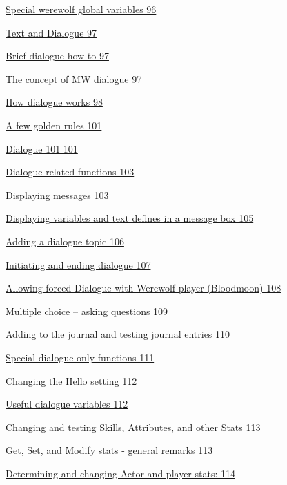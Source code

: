 \documentclass[
]{article}
\begin{document}
\protect\hyperlink{section-8}{Special werewolf global variables 96}

\protect\hyperlink{text-and-dialogue}{Text and Dialogue 97}

\protect\hyperlink{brief-dialogue-how-to}{Brief dialogue how-to 97}

\protect\hyperlink{the-concept-of-mw-dialogue}{The concept of MW
dialogue 97}

\protect\hyperlink{how-dialogue-works}{How dialogue works 98}

\protect\hyperlink{a-few-golden-rules}{A few golden rules 101}

\protect\hyperlink{dialogue-101}{Dialogue 101 101}

\protect\hyperlink{dialogue-related-functions}{Dialogue-related
functions 103}

\protect\hyperlink{displaying-messages}{Displaying messages 103}

\protect\hyperlink{_Toc182634588}{Displaying variables and text defines
in a message box 105}

\protect\hyperlink{adding-a-dialogue-topic}{Adding a dialogue topic 106}

\protect\hyperlink{initiating-and-ending-dialogue}{Initiating and ending
dialogue 107}

\protect\hyperlink{allowing-forced-dialogue-with-werewolf-player-bloodmoon}{Allowing
forced Dialogue with Werewolf player (Bloodmoon) 108}

\protect\hyperlink{multiple-choice-asking-questions}{Multiple choice --
asking questions 109}

\protect\hyperlink{adding-to-the-journal-and-testing-journal-entries}{Adding
to the journal and testing journal entries 110}

\protect\hyperlink{special-dialogue-only-functions}{Special
dialogue-only functions 111}

\protect\hyperlink{changing-the-hello-setting}{Changing the Hello
setting 112}

\protect\hyperlink{useful-dialogue-variables}{Useful dialogue variables
112}

\protect\hyperlink{changing-and-testing-skills-attributes-and-other-stats}{Changing
and testing Skills, Attributes, and other Stats 113}

\protect\hyperlink{get-set-and-modify-stats---general-remarks}{Get, Set,
and Modify stats - general remarks 113}

\protect\hyperlink{determining-and-changing-actor-and-player-stats}{Determining
and changing Actor and player stats: 114}
\end{document}
